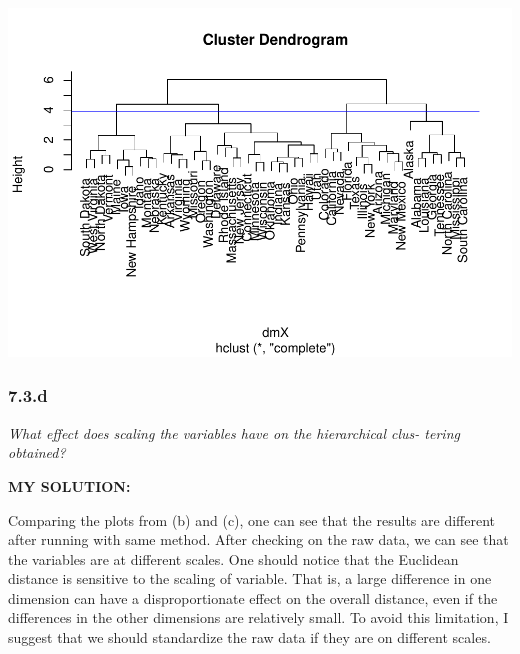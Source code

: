 \documentclass[
]{article}
\begin{document}
\includegraphics{HUDM6122-Homework_07-Chenguang-Pan_files/figure-latex/unnamed-chunk-6-1.pdf}

\hypertarget{d}{%
\subsubsection{7.3.d}\label{d}}

\emph{What effect does scaling the variables have on the hierarchical
clus- tering obtained?}

\textbf{MY SOLUTION:}

Comparing the plots from (b) and (c), one can see that the results are
different after running with same method. After checking on the raw
data, we can see that the variables are at different scales. One should
notice that the Euclidean distance is sensitive to the scaling of
variable. That is, a large difference in one dimension can have a
disproportionate effect on the overall distance, even if the differences
in the other dimensions are relatively small. To avoid this limitation,
I suggest that we should standardize the raw data if they are on
different scales.
\end{document}
